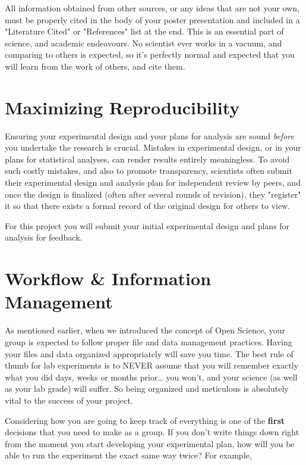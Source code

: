 \documentclass[
]{book}
\begin{document}
All information obtained from other sources, or any ideas that are not your own, must be properly cited in the body of your poster presentation and included in a "Literature Cited" or "References" list at the end. This is an essential part of science, and academic endeavours. No scientist ever works in a vacuum, and comparing to others is expected, so it's perfectly normal and expected that you will learn from the work of others, and cite them.

\hypertarget{maximizing-reproducibility}{%
\section*{Maximizing Reproducibility}\label{maximizing-reproducibility}}

Ensuring your experimental design and your plans for analysis are sound \emph{before} you undertake the research is crucial. Mistakes in experimental design, or in your plans for statistical analyses, can render results entirely meaningless. To avoid such costly mistakes, and also to promote transparency, scientists often submit their experimental design and analysis plan for independent review by peers, and once the design is finalized (often after several rounds of revision), they "register" it so that there exists a formal record of the original design for others to view.

For this project you will submit your initial experimental design and plans for analysis for feedback.

\hypertarget{workflow-information-management}{%
\section*{Workflow \& Information Management}\label{workflow-information-management}}

As mentioned earlier, when we introduced the concept of Open Science, your group is expected to follow proper file and data management practices. Having your files and data organized appropriately will save you time. The best rule of thumb for lab experiments is to NEVER assume that you will remember exactly what you did days, weeks or months prior\ldots{} you won't, and your science (as well as your lab grade) will suffer. So being organized and meticulous is absolutely vital to the success of your project.

Considering how you are going to keep track of everything is one of the \textbf{first} decisions that you need to make as a group. If you don't write things down right from the moment you start developing your experimental plan, how will you be able to run the experiment the exact same way twice? For example,
\end{document}
